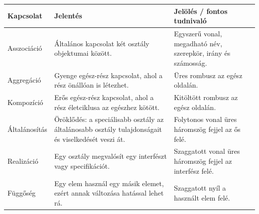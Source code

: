 \begin{tabularx}{\textwidth}{L{31mm}X X}
\toprule
\textbf{Kapcsolat} & \textbf{Jelentés} & \textbf{Jelölés / fontos tudnivaló} \\
\midrule
Asszociáció & Általános kapcsolat két osztály objektumai között. & Egyszerű vonal, megadható név, szerepkör, irány és számosság. \\
Aggregáció & Gyenge egész-rész kapcsolat, ahol a rész önállóan is létezhet. & Üres rombusz az egész oldalán. \\
Kompozíció & Erős egész-rész kapcsolat, ahol a rész életciklusa az egészhez kötött. & Kitöltött rombusz az egész oldalán. \\
Általánosítás & Öröklődés: a speciálisabb osztály az általánosabb osztály tulajdonságait és viselkedését veszi át. & Folytonos vonal üres háromszög fejjel az ős felé. \\
Realizáció & Egy osztály megvalósít egy interfészt vagy specifikációt. & Szaggatott vonal üres háromszög fejjel az interfész felé. \\
Függőség & Egy elem használ egy másik elemet, ezért annak változása hatással lehet rá. & Szaggatott nyíl a használt elem felé. \\
\bottomrule
\end{tabularx}

